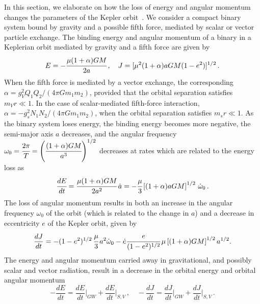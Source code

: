 \documentclass[aps,prd]{revtex4-2}
\begin{document}
In this section, we elaborate on how the loss of energy and angular momentum changes the parameters of the Kepler orbit~\cite{Seymour:2020yle, Chen:2025mwl}. We consider a compact binary system bound by gravity and a possible fifth force, mediated by scalar or vector particle exchange. The binding energy and angular momentum of a binary in a Keplerian orbit mediated by gravity and a fifth force are given by
\begin{equation}
    E = -\cfrac{\mu(1+\alpha) G   M}{2a}\,,\quad J = [\mu^2(1+\alpha)a GM (1-e^2)]^{1/2}\,.
\end{equation}
When the fifth force is mediated by a vector exchange, the corresponding $\alpha = g_{V}^2 Q_{1} Q_{2}/(4\pi Gm_{1} m_{2})$, provided that the orbital separation satisfies $m_{V} r \ll 1$. In the case of scalar-mediated fifth-force interaction, $\alpha=- g_s^2 N_1 N_2/(4 \pi G m_1 m_2)$, when the orbital separation satisfies $m_s r \ll 1$.  As the binary system loses energy, the binding energy becomes more negative, the semi-major axis $a$ decreases, and the angular frequency $\omega_0 = \cfrac{2\pi}{T} = \left( \cfrac{(1+\alpha)GM}{a^3} \right)^{1/2}$ decreases at rates which are related to the energy loss as
\begin{equation}\label{dEdt-orbit}
 \cfrac{dE}{dt} = \cfrac{\mu (1+\alpha)GM}{2a^2}\, \dot{a} = -\cfrac{\mu}{3} \left[(1+\alpha)aGM \right]^{1/2}\, \dot{\omega}_{0}\,.
\end{equation}
The loss of angular momentum results in both an increase in the angular frequency $\omega_0$ of the orbit (which is related to the change in $a$) and a decrease in eccentricity $e$ of the Kepler orbit, given by
\begin{equation}\label{dJdt-orbit}
    \frac{dJ}{dt} = -(1-e^2)^{1/2}\,\cfrac{\mu}{3}\,a^2\dot{\omega}_{0} - \dot{e}\cfrac{e}{(1-e^2)^{1/2}}\,\mu\left[(1+\alpha)GM\right]^{1/2}a^{1/2}.
\end{equation}
The energy and angular momentum carried away in gravitational, and possibly scalar and vector radiation, result in a decrease in the orbital energy and orbital angular momentum
\begin{equation}\label{extraEJ}
   - \frac{dE}{dt}= \frac{dE}{dt}\Big\vert_{GW} + \frac{dE}{dt}\Big\vert_{S,V} \,, \quad - \frac{dJ}{dt}= \frac{dJ}{dt}\Big\vert_{GW} + \frac{dJ}{dt}\Big\vert_{S,V}\,.
\end{equation}
\end{document}
